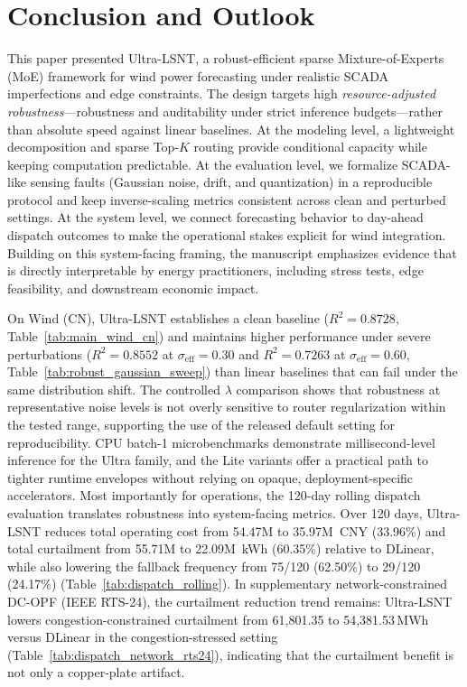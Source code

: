 \documentclass[review,3p,times]{elsarticle}
\begin{document}
\section{Conclusion and Outlook}
\label{sec:conclusion}

This paper presented Ultra-LSNT, a robust-efficient sparse Mixture-of-Experts (MoE) framework for wind power forecasting under realistic SCADA imperfections and edge constraints. The design targets high \emph{resource-adjusted robustness}---robustness and auditability under strict inference budgets---rather than absolute speed against linear baselines. At the modeling level, a lightweight decomposition and sparse Top-$K$ routing provide conditional capacity while keeping computation predictable. At the evaluation level, we formalize SCADA-like sensing faults (Gaussian noise, drift, and quantization) in a reproducible protocol and keep inverse-scaling metrics consistent across clean and perturbed settings. At the system level, we connect forecasting behavior to day-ahead dispatch outcomes to make the operational stakes explicit for wind integration. Building on this system-facing framing, the manuscript emphasizes evidence that is directly interpretable by energy practitioners, including stress tests, edge feasibility, and downstream economic impact.

On Wind (CN), Ultra-LSNT establishes a clean baseline ($R^2=0.8728$, Table~\ref{tab:main_wind_cn}) and maintains higher performance under severe perturbations ($R^2=0.8552$ at $\sigma_{\mathrm{eff}}=0.30$ and $R^2=0.7263$ at $\sigma_{\mathrm{eff}}=0.60$, Table~\ref{tab:robust_gaussian_sweep}) than linear baselines that can fail under the same distribution shift. The controlled $\lambda$ comparison shows that robustness at representative noise levels is not overly sensitive to router regularization within the tested range, supporting the use of the released default setting for reproducibility. CPU batch-1 microbenchmarks demonstrate millisecond-level inference for the Ultra family, and the Lite variants offer a practical path to tighter runtime envelopes without relying on opaque, deployment-specific accelerators. Most importantly for operations, the 120-day rolling dispatch evaluation translates robustness into system-facing metrics. Over 120 days, Ultra-LSNT reduces total operating cost from 54.47M to 35.97M~CNY (33.96\%) and total curtailment from 55.71M to 22.09M~kWh (60.35\%) relative to DLinear, while also lowering the fallback frequency from 75/120 (62.50\%) to 29/120 (24.17\%) (Table~\ref{tab:dispatch_rolling}). In supplementary network-constrained DC-OPF (IEEE RTS-24), the curtailment reduction trend remains: Ultra-LSNT lowers congestion-constrained curtailment from 61{,}801.35 to 54{,}381.53\,MWh versus DLinear in the congestion-stressed setting (Table~\ref{tab:dispatch_network_rts24}), indicating that the curtailment benefit is not only a copper-plate artifact.
\end{document}
